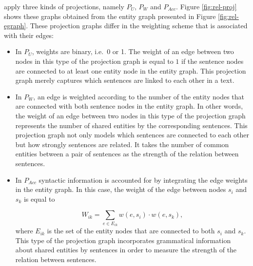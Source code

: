  apply three kinds of projections, namely $P_U$, $P_W$ and $P_{Acc}$. 
Figure \ref{fig:rel-proj} shows these graphs obtained from the entity graph presented in Figure \ref{fig:rel-egraph}. 
These projection graphs differ in the weighting scheme that is associated with their edges: 

\begin{itemize}

	\item In $P_U$, weights are binary, i.e.\ 0 or 1. 
	The weight of an edge between two nodes in this type of the projection graph is equal to $1$ if the sentence nodes are connected to at least one entity node in the entity graph.  
	This projection graph merely captures which sentences are linked to each other in a text. 

	\item In $P_W$, an edge is weighted according to the number of the entity nodes that are connected with both sentence nodes in the entity graph. 
	In other words, the weight of an edge between two nodes in this type of the projection graph represents the number of shared entities by the corresponding sentences. 
	This projection graph not only models which sentences are connected to each other but how strongly  sentences are related. 
	It takes the number of common entities between a pair of sentences as the strength of the relation between sentences. 

	\item In $P_{Acc}$ syntactic information is accounted for by integrating the edge weights in the entity graph. 
	In this case, the weight of the edge between nodes $s_i$ and $s_k$ is equal to

	\begin{equation}
		W_{ik} = \sum_{e \in E_{ik}}{w(e,s_i) \cdot w(e,s_k)},
	\end{equation}
	where $E_{ik}$ is the set of the entity nodes that are connected to both $s_i$ and $s_k$. 
	This type of the projection graph incorporates grammatical information about shared entities by sentences in order to measure the strength of the relation between sentences. 

\end{itemize}


